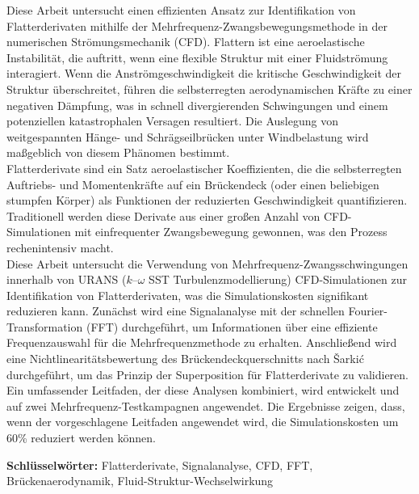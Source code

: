 Diese Arbeit untersucht einen effizienten Ansatz zur Identifikation von Flatterderivaten mithilfe der 
Mehrfrequenz-Zwangsbewegungsmethode in der numerischen Strömungsmechanik (CFD). Flattern ist eine aeroelastische Instabilität, die auftritt, 
wenn eine flexible Struktur mit einer Fluidströmung interagiert. Wenn die Anströmgeschwindigkeit die 
kritische Geschwindigkeit der Struktur überschreitet, führen die selbsterregten aerodynamischen Kräfte zu einer negativen Dämpfung, was in 
schnell divergierenden Schwingungen und einem potenziellen katastrophalen Versagen resultiert. Die Auslegung von weitgespannten Hänge- und 
Schrägseilbrücken unter Windbelastung wird maßgeblich von diesem Phänomen bestimmt. \\

Flatterderivate sind ein Satz aeroelastischer Koeffizienten, die die selbsterregten Auftriebs- und 
Momentenkräfte auf ein Brückendeck (oder einen beliebigen stumpfen Körper) als Funktionen der reduzierten Geschwindigkeit quantifizieren. Traditionell 
werden diese Derivate aus einer großen Anzahl von CFD-Simulationen mit einfrequenter Zwangsbewegung gewonnen, was den Prozess rechenintensiv macht. \\

Diese Arbeit untersucht die Verwendung von Mehrfrequenz-Zwangsschwingungen innerhalb von URANS ($k$--$\omega$ SST Turbulenzmodellierung) 
CFD-Simulationen zur Identifikation von Flatterderivaten, was die Simulationskosten signifikant reduzieren kann. Zunächst wird eine Signalanalyse mit der schnellen Fourier-Transformation (FFT) 
durchgeführt, um Informationen über eine effiziente Frequenzauswahl für die Mehrfrequenzmethode zu erhalten.
Anschließend wird eine Nichtlinearitätsbewertung des Brückendeckquerschnitts nach \v{S}arki\'c durchgeführt, um das Prinzip der 
Superposition für Flatterderivate zu validieren. Ein umfassender Leitfaden, der diese Analysen kombiniert, 
wird entwickelt und auf zwei Mehrfrequenz-Testkampagnen angewendet. Die Ergebnisse zeigen, dass, 
wenn der vorgeschlagene Leitfaden angewendet wird, die Simulationskosten um 60\% reduziert werden können. \\
\vspace{0.5cm}

\noindent\textbf{Schlüsselwörter:} 
Flatterderivate, Signalanalyse, CFD, FFT, Brückenaerodynamik, Fluid-Struktur-Wechselwirkung
